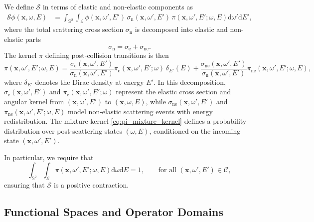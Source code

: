 \documentclass{amsart}
\newcommand{\dd}{{\mathrm d}}
\theoremstyle{plain}
\renewcommand{\vec}[1]{\ensuremath{\boldsymbol{#1}}}
\newcommand{\cS}{\ensuremath{\mathscr S}}
\begin{document}
We define $\cS$ in terms of elastic and non-elastic components as
\begin{align}
  \cS \phi(\vec{x}, \omega, E) 
  &=
  \int_{\mathbb{S}^2}\int_{\mathcal{E}} \phi(\vec{x}, \omega', E') \, \sigma_{\mathrm{n}}(\vec{x}, \omega', E') \,
  \pi(\vec{x}, \omega', E';  \omega,  E)\dd \omega' \dd E',
  \label{eq:bigS_def}
\end{align}
where the total scattering cross section $\sigma_{\mathrm{n}}$ is decomposed into
elastic and non-elastic parts
\begin{equation}
  \label{eq:bigS}
  \sigma_{\mathrm{n}} = \sigma_{\mathrm{e}} + \sigma_{\mathrm{ne}}.
\end{equation}
The  kernel $\pi$ defining post-collision transitions is then
\begin{equation}
  \pi(\vec{x}, \omega', E';  \omega,  E)
  =
  \frac{\sigma_{\mathrm{e}}(\vec{x}, \omega', E')}{\sigma_{\mathrm{n}}(\vec{x}, \omega', E')}
  \pi_{\mathrm{e}}(\vec{x}, \omega', E';  \omega) \, \delta_{E'}( E)
  +
  \frac{\sigma_{\mathrm{ne}}(\vec{x}, \omega', E')}{\sigma_{\mathrm{n}}(\vec{x}, \omega', E')}
  \pi_{\mathrm{ne}}(\vec{x}, \omega', E';  \omega,  E),
  \label{eq:pi_mixture_kernel}
\end{equation}
where $\delta_{E'}$ denotes the Dirac density at energy $E'$. 
In this decomposition, $\sigma_{\mathrm{e}}(\vec{x}, \omega', E')$ and
$\pi_{\mathrm{e}}(\vec{x}, \omega', E'; \omega)$ represent the elastic
cross section and angular kernel from $(\vec{x}, \omega', E')$ to
$(\vec{x}, \omega, E)$, while $\sigma_{\mathrm{ne}}(\vec{x}, \omega',
E')$ and $\pi_{\mathrm{ne}}(\vec{x}, \omega', E'; \omega, E)$ model
non-elastic scattering events with energy redistribution.
The 
mixture kernel \eqref{eq:pi_mixture_kernel} defines a probability distribution over post-scattering
states $(\omega, E)$, conditioned on the incoming state $(\vec{x},
\omega', E')$.

In particular, we require that
\begin{equation}
  \int_{\mathbb{S}^2} \int_{\mathcal{E}} 
  \pi(\vec{x}, \omega', E';  \omega,  E)\dd \omega\dd E = 1,
  \qquad \text{for all } (\vec{x}, \omega', E') \in \mathcal{C},
  \label{eq:pi_is_prob_dist}
\end{equation}
ensuring that $\cS$ is a positive contraction.


\subsection{Functional Spaces and Operator Domains}
\end{document}
